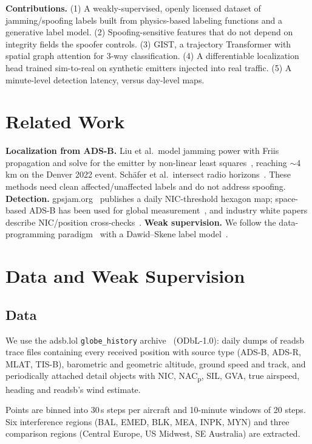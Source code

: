 \documentclass[conference]{IEEEtran}
\begin{document}
\textbf{Contributions.} (1) A weakly-supervised, openly licensed dataset of jamming/spoofing labels built
from physics-based labeling functions and a generative label model. (2) Spoofing-sensitive features that
do not depend on integrity fields the spoofer controls. (3) GIST, a trajectory Transformer with spatial
graph attention for 3-way classification. (4) A differentiable localization head trained sim-to-real on
synthetic emitters injected into real traffic. (5) A minute-level detection latency, versus day-level maps.

\section{Related Work}
\textbf{Localization from ADS-B.} Liu et al.\ model jamming power with Friis propagation and solve for the
emitter by non-linear least squares~\cite{liu2022itm,liu2025nls}, reaching $\sim$4\,km on the Denver 2022
event. Sch\"afer et al.\ intersect radio horizons~\cite{jammerhorizon}. These methods need clean
affected/unaffected labels and do not address spoofing. \textbf{Detection.} gpsjam.org~\cite{gpsjam}
publishes a daily NIC-threshold hexagon map; space-based ADS-B has been used for global
measurement~\cite{eichstaedt2026sharc}, and industry white papers describe NIC/position cross-checks~\cite{aireon2026spoofing}.
\textbf{Weak supervision.} We follow the data-programming paradigm~\cite{ratner2017snorkel} with a
Dawid--Skene label model~\cite{dawid1979}.

\section{Data and Weak Supervision}
\subsection{Data}
We use the adsb.lol \texttt{globe\_history} archive~\cite{adsblol} (ODbL-1.0): daily dumps of readsb~\cite{readsb}
trace files containing every received position with source type (ADS-B, ADS-R, MLAT, TIS-B), barometric
and geometric altitude, ground speed and track, and periodically attached detail objects with NIC,
NAC\textsubscript{p}, SIL, GVA, true airspeed, heading and readsb's wind estimate. \datasetsentence

Points are binned into 30\,s steps per aircraft and 10-minute windows of 20 steps. Six interference regions
(BAL, EMED, BLK, MEA, INPK, MYN) and three comparison regions (Central Europe, US Midwest, SE Australia) are
extracted.
\end{document}
